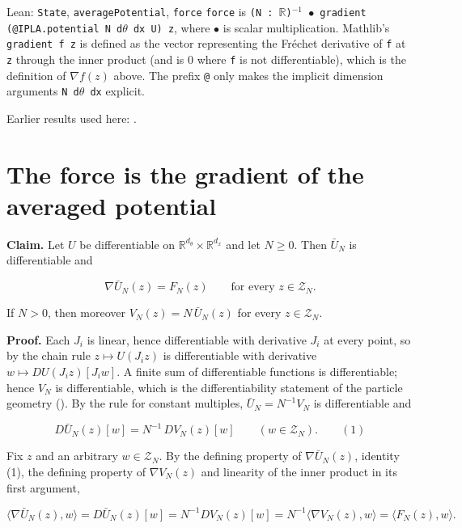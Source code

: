 \documentclass[11pt,a4paper]{article}
\begin{document}
\begin{leanbox}{Lean: \texttt{State}, \texttt{averagePotential}, \texttt{force}}
\texttt{force} is \texttt{(N : \ensuremath{\mathbb R})\ensuremath{{}^{-1}} \ensuremath{\bullet} gradient (@IPLA.\allowbreak{}potential N d\ensuremath{\theta} dx U) z}, where \texttt{\ensuremath{\bullet}} is scalar multiplication. Mathlib's \texttt{gradient f z} is defined as the vector representing the Fréchet derivative of \texttt{f} at \texttt{z} through the inner product (and is \(0\) where \texttt{f} is not differentiable), which is the definition of \(\nabla f(z)\) above. The prefix \texttt{@} only makes the implicit dimension arguments \texttt{N d\ensuremath{\theta} dx} explicit.
\end{leanbox}


Earlier results used here: \cite[Section~3.1.1]{LangevinLean2026IPLA}.

\section{\texorpdfstring{The force is the gradient of the averaged potential}{The force is the gradient of the averaged potential}}


\textbf{Claim.} Let \(U\) be differentiable on \(\mathbb R^{d_\theta}\times\mathbb R^{d_x}\) and let \(N\ge0\). Then \(\bar U_N\) is differentiable and


\[\nabla\bar U_N(z)=F_N(z)\qquad\text{for every }z\in\mathcal Z_N.\]


If \(N>0\), then moreover \(V_N(z)=N\,\bar U_N(z)\) for every \(z\in\mathcal Z_N\).




\textbf{Proof.} Each \(J_i\) is linear, hence differentiable with derivative \(J_i\) at every point, so by the chain rule \(z\mapsto U(J_iz)\) is differentiable with derivative \(w\mapsto DU(J_iz)[J_iw]\). A finite sum of differentiable functions is differentiable; hence \(V_N\) is differentiable, which is the differentiability statement of the particle geometry (\cite[Section~3.1.3]{LangevinLean2026IPLA}). By the rule for constant multiples, \(\bar U_N=N^{-1}V_N\) is differentiable and


\[D\bar U_N(z)[w]=N^{-1}\,DV_N(z)[w]\qquad(w\in\mathcal Z_N).\qquad(1)\]


Fix \(z\) and an arbitrary \(w\in\mathcal Z_N\). By the defining property of \(\nabla\bar U_N(z)\), identity (1), the defining property of \(\nabla V_N(z)\) and linearity of the inner product in its first argument,


\[\langle\nabla\bar U_N(z),w\rangle=D\bar U_N(z)[w]=N^{-1}DV_N(z)[w]=N^{-1}\langle\nabla V_N(z),w\rangle=\langle F_N(z),w\rangle.\]
\end{document}
